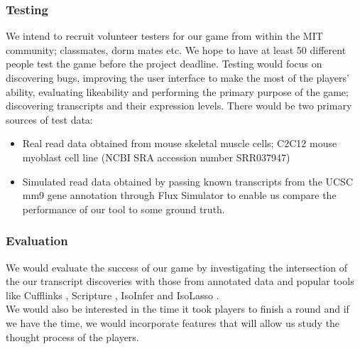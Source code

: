 \documentclass[12pt]{article}
\begin{document}
\subsubsection*{Testing}
We intend to recruit volunteer testers for our game from within the MIT community; classmates, dorm mates etc. We hope to have at least 50 different people test the game before the project deadline. Testing would focus on discovering bugs, improving the user interface to make the most of the players' ability, evaluating likeability and performing the primary purpose of the game; discovering transcripts and their expression levels. There would be two primary sources of test data:
\begin{itemize}
\item Real read data obtained from mouse skeletal muscle cells; C2C12 mouse myoblast cell line (NCBI SRA accession number SRR037947) \citep{trapnell2010transcript}
\item Simulated read data obtained by passing known transcripts from the UCSC mm9 gene annotation \citep{karolchik2008ucsc} through Flux Simulator \citep{sammeth2010flux} to enable us compare the performance of our tool to some ground truth.
\end{itemize}
\subsubsection*{Evaluation}
We would evaluate the success of our game by investigating the intersection of the our transcript discoveries with those from annotated data and popular tools like Cufflinks \citep{trapnell2010transcript}, Scripture \citep{guttman2010ab} , IsoInfer \citep{feng2010inference} and IsoLasso \citep{li2011isolasso}. \\
We would also be interested in the time it took players to finish a round and if we have the time, we would incorporate features that will allow us study the thought process of the players.
\end{document}
